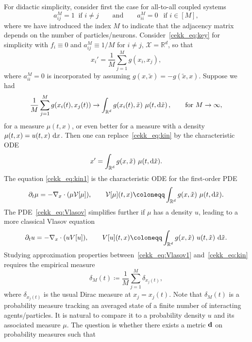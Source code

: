 \documentclass[10pt]{article}
\newcommand{\benn}{\begin{equation*}}
\newcommand{\eenn}{\end{equation*}}
\begin{document}
For didactic simplicity, consider first the case for all-to-all coupled systems~\cite{Golse} 
\benn
a^M_{ij}=1~\text{ if $i\neq j$}\qquad \text{and}\qquad a^M_{ii}=0~~\text{ if $i\in[M]$},
\eenn
where we have introduced the index $M$ to indicate that the adjacency matrix depends on the number of particles/neurons. Consider~\eqref{cekk_eq:key} for simplicity with $f_i\equiv0$ and $a^M_{ij}\equiv1/M$ for $i\neq j$, $\mathcal{X}=\mathbb{R}^d$, so that
\begin{equation}
	\label{cekk_eq:kin}
	x_i' = \frac1M\sum_{j=1}^M g(x_i,x_j), 
\end{equation} 
where $a^M_{ii}=0$ is incorporated by assuming $g(x,\tilde{x})=-g(\tilde{x},x)$. Suppose we had
\begin{equation*}
	\frac1M\sum_{j=1}^M g(x_i(t),x_j(t)) \rightarrow \int_{\mathbb{R}^d} g(x_i(t),\tilde{x})~\mu(t,\textnormal{d} \tilde{x})\,,\qquad \text{for }M\rightarrow \infty,
\end{equation*}
for a measure $\mu(t,x)$, or even better for a measure with a density $\mu(t,x)=u(t,x)~\textnormal{d} x$.
Then one can replace~\eqref{cekk_eq:kin} by the characteristic ODE
\begin{equation}
	\label{cekk_eq:kin1}
	x' = \int_{\mathbb{R}^d} g(x,\tilde{x})~\mu(t,\textnormal{d} \tilde{x}). 
\end{equation}
The equation \eqref{cekk_eq:kin1} is the characteristic ODE for the first-order PDE
\begin{equation}
	\label{cekk_eq:Vlasov}
	\partial_t \mu = -\nabla_x \cdot (\mu \mathcal{V}[\mu]),\qquad \mathcal{V}[\mu](t,x)\coloneqq\int_{\mathbb{R}^d} g(x,\tilde{x})~\mu(t,\textnormal{d} \tilde{x}).    
\end{equation} 
The PDE~\eqref{cekk_eq:Vlasov} simplifies further if $\mu$ has a density $u$, leading to a more classical Vlasov equation
\begin{equation}
	\label{cekk_eq:Vlasov1}
	\partial_t u = -\nabla_x \cdot (u V[u]),\qquad V[u](t,x)\coloneqq\int_{\mathbb{R}^d} g(x,\tilde{x})~u(t,\tilde{x})~\textnormal{d} \tilde{x}.    
\end{equation} 
Studying approximation properties between~\eqref{cekk_eq:Vlasov1} and~\eqref{cekk_eq:kin} requires the empirical measure
\begin{equation*}
	\delta_{M}(t)\coloneqq\frac{1}{M}\sum_{j=1}^M \delta_{x_j(t)},
\end{equation*}   
where $\delta_{x_j(t)}$ is the usual Dirac measure at $x_j=x_j(t)$. Note that $\delta_M(t)$ is a probability measure tracking an averaged state of a finite number of interacting agents/particles. It is natural to compare it to a probability density $u$ and its associated measure $\mu$. The question is whether there exists a metric ${\bf d}$ on probability measures such that
\end{document}
